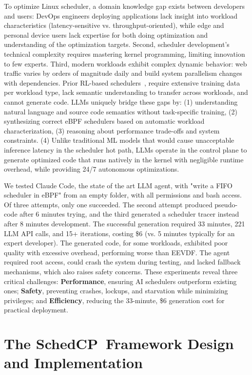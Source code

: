 \documentclass[preprint]{article}
\newcommand{\sys}{SchedCP\xspace}
\begin{document}
To optimize Linux scheduler, a domain knowledge gap exists between developers and users: DevOps engineers deploying applications lack insight into workload characteristics (latency-sensitive vs. throughput-oriented), while edge and personal device users lack expertise for both doing optimization and understanding of the optimization targets. Second, scheduler development's technical complexity requires mastering kernel programming, limiting innovation to few experts. Third, modern workloads exhibit complex dynamic behavior: web traffic varies by orders of magnitude daily and build system parallelism changes with dependencies. Prior RL-based schedulers~\cite{mao2019decima,qiu2020firm,zhang2024mrsch,mao2019park}, require extensive training data per workload type, lack semantic understanding to transfer across workloads, and cannot generate code. LLMs uniquely bridge these gaps by: (1) understanding natural language and source code semantics without task-specific training, (2) synthesizing correct eBPF schedulers based on automatic workload characterization, (3) reasoning about performance trade-offs and system constraints. (4) Unlike traditional ML models that would cause unacceptable inference latency in the scheduler hot path, LLMs operate in the control plane to generate optimized code that runs natively in the kernel with negligible runtime overhead, while providing 24/7 autonomous optimizations.


We tested Claude Code\cite{claudecode}, the state of the art LLM agent, with "write a FIFO scheduler in eBPF" from an empty folder, with all permissions and bash access. Of three attempts, only one succeeded. The second attempt produced pseudo-code after 6 minutes trying, and the third generated a scheduler tracer instead after 8 minutes development. The successful generation required 33 minutes, 221 LLM API calls, and 15+ iterations, costing \$6 (vs. 5 minutes typically for an expert developer). The generated code, for some workloads, exhibited poor quality with excessive overhead, performing worse than EEVDF. The agent required root access, could crash the system during testing, and lacked fallback mechanisms, which also raises safety concerns. These experiments reveal three critical challenges: \textbf{Performance}, ensuring AI schedulers outperform existing ones; \textbf{Safety}, preventing crashes, lockups, and starvation while minimizing privileges; and \textbf{Efficiency}, reducing the 33-minute, \$6 generation cost for practical deployment.

\section{The \sys\ Framework Design and Implementation}
\label{sec:schedcp_framework}
\end{document}
